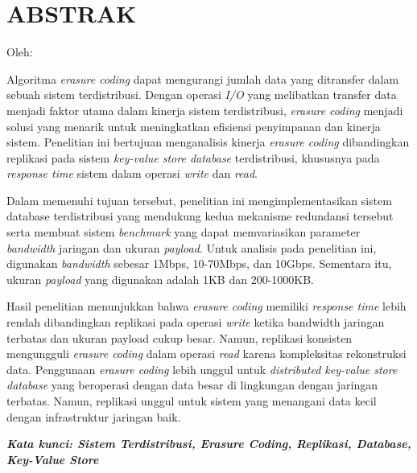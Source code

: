 \clearpage
\chapter*{ABSTRAK}

\begin{center}
  \center
  \begin{singlespace}
    \large\bfseries\MakeUppercase{\thetitle}
    
    \normalfont\normalsize
    Oleh:
    
    \bfseries \theauthor
  \end{singlespace}
\end{center}

\begin{singlespace}
  \small
  Algoritma \textit{erasure coding} dapat mengurangi jumlah data yang ditransfer dalam sebuah sistem terdistribusi. Dengan operasi \textit{I/O} yang melibatkan transfer data menjadi faktor utama dalam kinerja sistem terdistribusi, \textit{erasure coding} menjadi solusi yang menarik untuk meningkatkan efisiensi penyimpanan dan kinerja sistem. Penelitian ini bertujuan menganalisis kinerja \textit{erasure coding} dibandingkan replikasi pada sistem \textit{key-value store database} terdistribusi, khususnya pada \textit{response time} sistem dalam operasi \textit{write} dan \textit{read}.

  Dalam memenuhi tujuan tersebut, penelitian ini mengimplementasikan sistem database terdistribusi yang mendukung kedua mekanisme redundansi tersebut serta membuat sistem \textit{benchmark} yang dapat memvariasikan parameter \textit{bandwidth} jaringan dan ukuran \textit{payload}. Untuk analisis pada penelitian ini, digunakan \textit{bandwidth} sebesar 1Mbps, 10-70Mbps, dan 10Gbps. Sementara itu, ukuran \textit{payload} yang digunakan adalah 1KB dan 200-1000KB. 

  Hasil penelitian menunjukkan bahwa \textit{erasure coding} memiliki \textit{response time} lebih rendah dibandingkan replikasi pada operasi \textit{write} ketika bandwidth jaringan terbatas dan ukuran payload cukup besar. Namun, replikasi konsisten mengungguli \textit{erasure coding} dalam operasi \textit{read} karena kompleksitas rekonstruksi data. Penggunaan \textit{erasure coding} lebih unggul untuk \textit{distributed key-value store database} yang beroperasi dengan data besar di lingkungan dengan jaringan terbatas. Namun, replikasi unggul untuk sistem yang menangani data kecil dengan infrastruktur jaringan baik.

  \textbf{\textit{Kata kunci: Sistem Terdistribusi, Erasure Coding, Replikasi, Database, Key-Value Store }}
  
\end{singlespace}
\clearpage